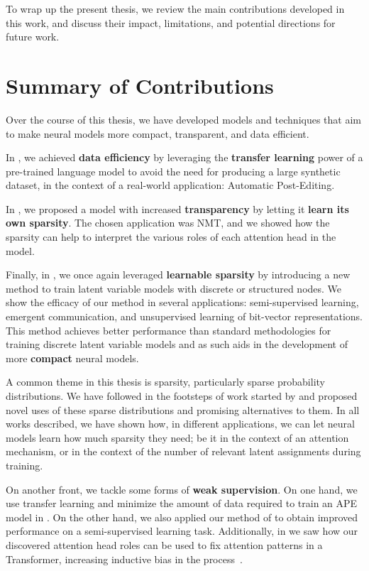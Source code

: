 \label{chap:conclusions}

\cleardoublepage
{}

To wrap up the present thesis, we review the main contributions
developed in this work, and discuss their impact, limitations, and
potential directions for future work.

\section{Summary of Contributions}

Over the course of this thesis, we have developed models and
techniques that aim to make neural models more compact, transparent,
and data efficient.

In , we achieved \textbf{data efficiency} by
leveraging the \textbf{transfer learning} power of a pre-trained
language model to avoid the need for producing a large synthetic
dataset, in the context of a real-world application: Automatic
Post-Editing.

In , we proposed a model with increased
\textbf{transparency} by letting it \textbf{learn its own sparsity}.
The chosen application was NMT, and we showed
how the sparsity can help to interpret the various roles of each
attention head in the model.

Finally, in , we once again leveraged
\textbf{learnable sparsity} by introducing a new method to train
latent variable models with discrete or structured nodes. We show the
efficacy of our method in several applications: semi-supervised
learning, emergent communication, and unsupervised learning of
bit-vector representations. This method achieves better performance
than standard methodologies for training discrete latent variable
models and as such aids in the development of more \textbf{compact}
neural models.

A common theme in this thesis is sparsity, particularly
sparse probability distributions. We have followed in the footsteps
of work started by \citet{sparsemax} and proposed novel uses of
these sparse distributions and promising alternatives to them.
In all works described, we have shown how, in different applications,
we can let neural models learn how much sparsity they need; be it
in the context of an attention mechanism, or in the context of
the number of relevant latent assignments during training.

On another front, we tackle some forms of \textbf{weak supervision}.
On one hand, we use transfer learning and minimize the amount of data
required to train an APE model in . On the other
hand, we also applied our method of  to
obtain improved performance on a semi-supervised learning task.
Additionally, in  we saw how our
discovered attention head roles can be used to fix attention patterns
in a Transformer, increasing inductive bias in the
process~\citep{raganato2020FixedEncoderSelfAttentiona}.

